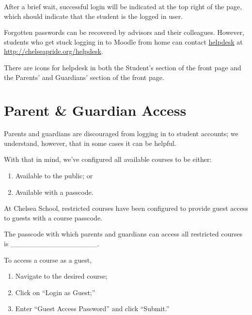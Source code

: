 \documentclass[letterpaper,10pt,english]{sphinxmanual}
\begin{document}
After a brief wait, successful login will be indicated at the top right of the page, which should indicate that the student is the logged in user.

Forgotten passwords can be recovered by advisors and their colleagues. However, students who get stuck logging in to Moodle from home can contact \href{http://chelseapride.org/helpdesk}{helpdesk} at \href{http://chelseapride.org/helpdesk}{http://chelseapride.org/helpdesk}.

There are icons for helpdesk in both the Student's section of the front page and the Parents' and Guardians' section of the front page.


\section{Parent \& Guardian Access}
\label{moodle:parent-guardian-access}
Parents and guardians are discouraged from logging in to student accounts; we understand, however, that in some cases it can be helpful.

With that in mind, we've configured all available courses to be either:
\begin{enumerate}
\item {} 
Available to the public; or

\item {} 
Available with a passcode.

\end{enumerate}

At Chelsea School, restricted courses have been configured to provide guest access to guests with a course passcode.

The passcode with which parents and guardians can access all restricted courses is \_\_\_\_\_\_\_\_\_\_\_\_\_\_\_\_\_.

To access a course as a guest,
\begin{enumerate}
\item {} 
Navigate to the desired course;

\item {} 
Click on ``Login as Guest;''

\item {} 
Enter ``Guest Access Password'' and click ``Submit.''

\end{enumerate}
\end{document}
